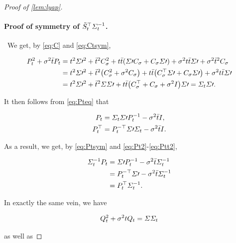 \begin{proof}[Proof of \cref{lem:lyap}]
\paragraph{Proof of symmetry of $\tilde{S}_{t}^\top\Sigma^{-1}_{t}$.}
~We get, by \eqref{eq:C} and \eqref{eq:Ctsym},

\begin{align}
\nn
\Pt^2 + \sdev^2\ctimebar\Pt &= t^2 \Sigma\prime^2 + \ctimebar^2\C^2 + \ctime\ctimebar\parens*{ \Sigma\prime\C + \C\Sigma\prime } + \sdev^2 \ctime\ctimebar \Sigma\prime + \sdev^2\ctimebar^2 \C \\
\nn
&= t^2 \Sigma\prime^2 + \ctimebar^2 \parens*{ \C^2 + \sdev^2\C } + \ctime\ctimebar\parens*{ \C^\top\Sigma\prime + \C\Sigma\prime } + \sdev^2 \ctime\ctimebar \Sigma\prime\\
\label{eq:Pteq}
&= t^2 \Sigma\prime^2 + \ctimebar^2 \Sigma\Sigma\prime + \ctime\ctimebar\parens*{ \C^\top + \C + \sdev^2\eye}\Sigma\prime = \Sigcurve\Sigma\prime.
\end{align}

It then follows from \eqref{eq:Pteq} that

\begin{align}
\label{eq:Pt2}
P_{t} &=  \Sigma_{t}\Sigma\prime P_{t}^{-1} - \sigma^2 \bar{t}I, \\
\label{eq:Ptt2}
P_{t}^\top &=  P_{t}^{-\top} \Sigma\prime\Sigma_{t} - \sigma^2\bar{t}I.
\end{align}

As a result, we get, by \eqref{eq:Ptsym} and \eqref{eq:Pt2}-\eqref{eq:Ptt2},

\begin{align}
\nonumber
\Sigma^{-1}_{t} P_{t} &= \Sigma\prime P_{t}^{-1} - \sigma^2\bar{t}\Sigma^{-1}_{t} \\
\nonumber
&= P_{t}^{-\top}\Sigma\prime - \sigma^2\bar{t}\Sigma^{-1}_{t} \\
\label{eq:PtSig}
&= P_{t}^\top\Sigma_{t}^{-1}.
\end{align}

In exactly the same vein, we have

\begin{align}
\label{eq:Qteq}
Q_{t}^2 + \sigma^2 tQ_{t} = \Sigma\Sigma_{t}
\end{align}

as well as


\end{proof}
